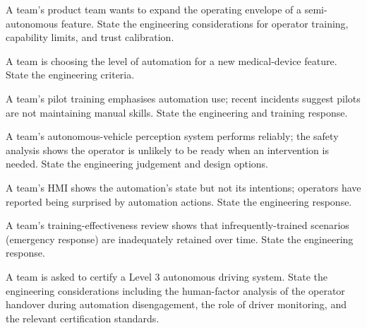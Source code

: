 \begin{exercise}
A team's product team wants to expand the operating envelope of a semi-autonomous feature. State the engineering considerations for operator training, capability limits, and trust calibration.
\end{exercise}

\begin{exercise}
A team is choosing the level of automation for a new medical-device feature. State the engineering criteria.
\end{exercise}

\begin{exercise}
A team's pilot training emphasises automation use; recent incidents suggest pilots are not maintaining manual skills. State the engineering and training response.
\end{exercise}

\begin{exercise}
A team's autonomous-vehicle perception system performs reliably; the safety analysis shows the operator is unlikely to be ready when an intervention is needed. State the engineering judgement and design options.
\end{exercise}

\begin{exercise}
A team's HMI shows the automation's state but not its intentions; operators have reported being surprised by automation actions. State the engineering response.
\end{exercise}

\begin{exercise}
A team's training-effectiveness review shows that infrequently-trained scenarios (emergency response) are inadequately retained over time. State the engineering response.
\end{exercise}

\begin{exercise}
A team is asked to certify a Level 3 autonomous driving system. State the engineering considerations including the human-factor analysis of the operator handover during automation disengagement, the role of driver monitoring, and the relevant certification standards.
\end{exercise}
